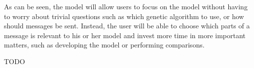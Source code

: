 As can be seen, the model will allow users to focus on the model without having to worry about trivial questions such as which genetic algorithm to use, or how should messages be sent. Instead, the user will be able to choose which parts of a message is relevant to his or her model and invest more time in more important matters, such as developing the model or performing comparisons.

TODO

